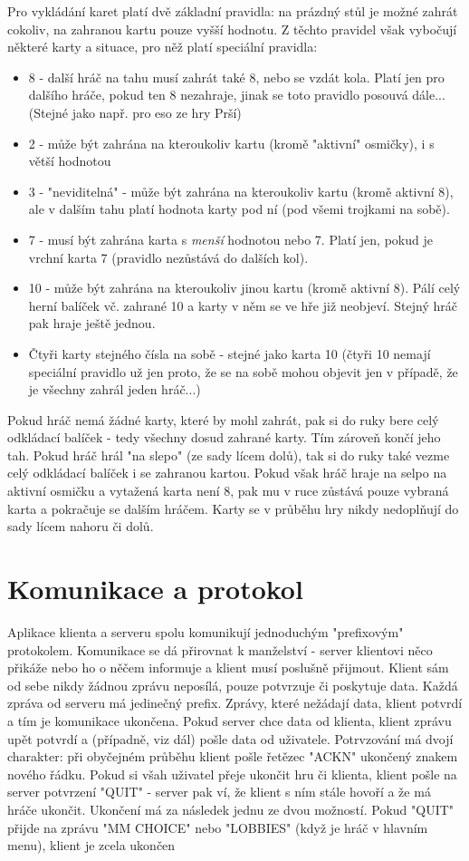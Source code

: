 Pro vykládání karet platí dvě základní pravidla: na prázdný stůl je možné zahrát cokoliv, na zahranou kartu pouze vyšší hodnotu. Z těchto pravidel však vybočují některé karty a situace, pro něž platí speciální pravidla:
\begin{itemize}
    \item 8 - další hráč na tahu musí zahrát také 8, nebo se vzdát kola. Platí jen pro dalšího hráče, pokud ten 8 nezahraje, jinak se toto pravidlo posouvá dále... (Stejné jako např. pro eso ze hry Prší)
    \item 2 - může být zahrána na kteroukoliv kartu (kromě "aktivní" osmičky), i s větší hodnotou
    \item 3 - "neviditelná" - může být zahrána na kteroukoliv kartu (kromě aktivní 8), ale v dalším tahu platí hodnota karty pod ní (pod všemi trojkami na sobě).
    \item 7 - musí být zahrána karta s \emph{menší} hodnotou nebo 7. Platí jen, pokud je vrchní karta 7 (pravidlo nezůstává do dalších kol).
    \item 10 - může být zahrána na kteroukoliv jinou kartu (kromě aktivní 8). Pálí celý herní balíček vč. zahrané 10 a karty v něm se ve hře již neobjeví. Stejný hráč pak hraje ještě jednou.
    \item Čtyři karty stejného čísla na sobě - stejné jako karta 10 (čtyři 10 nemají speciální pravidlo už jen proto, že se na sobě mohou objevit jen v případě, že je všechny zahrál jeden hráč...)
\end{itemize}
Pokud hráč nemá žádné karty, které by mohl zahrát, pak si do ruky bere celý odkládací balíček - tedy všechny dosud zahrané karty. Tím zároveň končí jeho tah. Pokud hráč hrál "na slepo" (ze sady lícem dolů), tak si do ruky také vezme celý odkládací balíček i se zahranou kartou. Pokud však hráč hraje na selpo na aktivní osmičku a vytažená karta není 8, pak mu v ruce zůstává pouze vybraná karta a pokračuje se dalším hráčem. Karty se v průběhu hry nikdy nedoplňují do sady lícem nahoru či dolů.

\section{Komunikace a protokol}

Aplikace klienta a serveru spolu komunikují jednoduchým "prefixovým" protokolem. Komunikace se dá přirovnat k manželství - server klientovi něco přikáže nebo ho o něčem informuje a klient musí poslušně přijmout. Klient sám od sebe nikdy žádnou zprávu neposílá, pouze potvrzuje či poskytuje data. Každá zpráva od serveru má jedinečný prefix. Zprávy, které nežádají data, klient potvrdí a tím je komunikace ukončena. Pokud server chce data od klienta, klient zprávu upět potvrdí a (případně, viz dál) pošle data od uživatele. Potrvzování má dvojí charakter: při obyčejném průběhu klient pošle řetězec "ACKN" ukončený znakem nového řádku. Pokud si všah uživatel přeje ukončit hru či klienta, klient pošle na server potvrzení "QUIT" - server pak ví, že klient s ním stále hovoří a že má hráče ukončit. Ukončení má za následek jednu ze dvou možností. Pokud "QUIT" přijde na zprávu "MM CHOICE" nebo "LOBBIES" (když je hráč v hlavním menu), klient je zcela ukončen